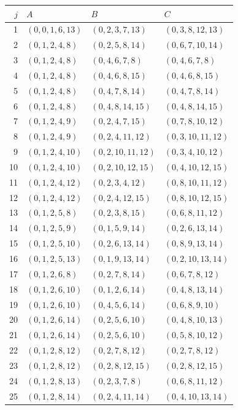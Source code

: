 \begin{longtable}{rlll}
\hline
$j$ & $A$ & $B$ & $C$ \\
\hline
\endhead
1 & $(0,0,1,6,13)$ & $(0,2,3,7,13)$ & $(0,3,8,12,13)$ \\
2 & $(0,1,2,4,8)$ & $(0,2,5,8,14)$ & $(0,6,7,10,14)$ \\
3 & $(0,1,2,4,8)$ & $(0,4,6,7,8)$ & $(0,4,6,7,8)$ \\
4 & $(0,1,2,4,8)$ & $(0,4,6,8,15)$ & $(0,4,6,8,15)$ \\
5 & $(0,1,2,4,8)$ & $(0,4,7,8,14)$ & $(0,4,7,8,14)$ \\
6 & $(0,1,2,4,8)$ & $(0,4,8,14,15)$ & $(0,4,8,14,15)$ \\
7 & $(0,1,2,4,9)$ & $(0,2,4,7,15)$ & $(0,7,8,10,12)$ \\
8 & $(0,1,2,4,9)$ & $(0,2,4,11,12)$ & $(0,3,10,11,12)$ \\
9 & $(0,1,2,4,10)$ & $(0,2,10,11,12)$ & $(0,3,4,10,12)$ \\
10 & $(0,1,2,4,10)$ & $(0,2,10,12,15)$ & $(0,4,10,12,15)$ \\
11 & $(0,1,2,4,12)$ & $(0,2,3,4,12)$ & $(0,8,10,11,12)$ \\
12 & $(0,1,2,4,12)$ & $(0,2,4,12,15)$ & $(0,8,10,12,15)$ \\
13 & $(0,1,2,5,8)$ & $(0,2,3,8,15)$ & $(0,6,8,11,12)$ \\
14 & $(0,1,2,5,9)$ & $(0,1,5,9,14)$ & $(0,2,6,13,14)$ \\
15 & $(0,1,2,5,10)$ & $(0,2,6,13,14)$ & $(0,8,9,13,14)$ \\
16 & $(0,1,2,5,13)$ & $(0,1,9,13,14)$ & $(0,2,10,13,14)$ \\
17 & $(0,1,2,6,8)$ & $(0,2,7,8,14)$ & $(0,6,7,8,12)$ \\
18 & $(0,1,2,6,10)$ & $(0,1,2,6,14)$ & $(0,4,8,13,14)$ \\
19 & $(0,1,2,6,10)$ & $(0,4,5,6,14)$ & $(0,6,8,9,10)$ \\
20 & $(0,1,2,6,14)$ & $(0,2,5,6,10)$ & $(0,4,8,10,13)$ \\
21 & $(0,1,2,6,14)$ & $(0,2,5,6,10)$ & $(0,5,8,10,12)$ \\
22 & $(0,1,2,8,12)$ & $(0,2,7,8,12)$ & $(0,2,7,8,12)$ \\
23 & $(0,1,2,8,12)$ & $(0,2,8,12,15)$ & $(0,2,8,12,15)$ \\
24 & $(0,1,2,8,13)$ & $(0,2,3,7,8)$ & $(0,6,8,11,12)$ \\
25 & $(0,1,2,8,14)$ & $(0,2,4,11,14)$ & $(0,4,10,13,14)$ \\

\end{longtable}

